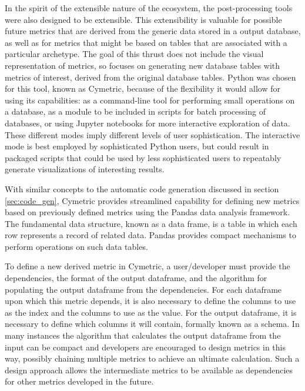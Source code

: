 In the spirit of the extensible nature of the \Cyclus ecosystem, the
post-processing tools were also designed to be extensible.  This extensibility
is valuable for possible future metrics that are derived from the generic data
stored in a \Cyclus output database, as well as for metrics that might be
based on tables that are associated with a particular archetype.  The goal of
this thrust does not include the visual representation of metrics, so focuses
on generating new database tables with metrics of interest, derived from the
original database tables.  Python was chosen for this tool, known as Cymetric,
because of the flexibility it would allow for using its capabilities: as a
command-line tool for performing small operations on a database, as a module
to be included in scripts for batch processing of databases, or using
Jupyter notebooks for more interactive exploration of data.
These different modes imply different levels of user sophistication.  The
interactive mode is best employed by sophisticated Python users, but could
result in packaged scripts that could be used by less sophisticated users to
repeatably generate visualizations of interesting results.

With similar concepts to the automatic code generation discussed in section
\ref{sec:code_gen}, Cymetric provides streamlined capability for defining new
metrics based on previously defined metrics using the Pandas data analysis
framework.  The fundamental data structure, known as a data
frame, is a table in which each row represents a record of related data.
Pandas provides compact mechanisms to perform operations on such data tables.

To define a new derived metric in Cymetric, a user/developer must provide the
dependencies, the format of the output dataframe, and the algorithm for
populating the output dataframe from the dependencies.  For each dataframe
upon which this metric depends, it is also necessary to define the columns to
use as the index and the columns to use as the value.  For the output
dataframe, it is necessary to define which columns it will contain, formally
known as a schema.  In many instances the algorithm that calculates the output
dataframe from the input can be compact and developers are encouraged to
design metrics in this way, possibly chaining multiple metrics to achieve an
ultimate calculation.  Such a design approach allows the intermediate metrics
to be available as dependencies for other metrics developed in the future.


